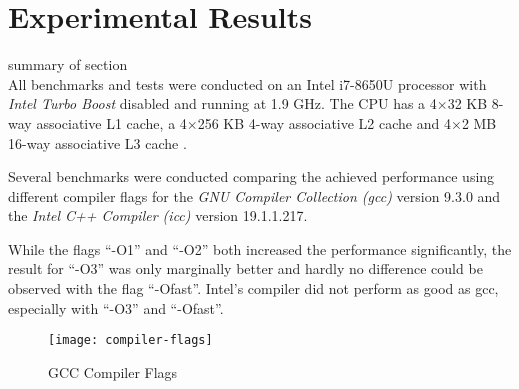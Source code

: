 \section{Experimental Results}\label{sec:exp}

summary of section\\

 All benchmarks and tests were conducted on an Intel
i7-8650U processor with \textit{Intel Turbo Boost} disabled and running at 1.9
GHz. The CPU has a 4$\times$32 KB 8-way associative L1 cache, a 4$\times$256 KB
4-way associative L2 cache and 4$\times$2 MB 16-way associative L3 cache
\cite{intel-opt-manual}.

 Several benchmarks were conducted comparing the achieved
performance using different compiler flags for the \textit{GNU Compiler
  Collection (gcc)} version 9.3.0 and the \textit{Intel C++ Compiler (icc)}
version 19.1.1.217.

While the flags ``-O1'' and ``-O2'' both increased the performance
significantly, the result for ``-O3'' was only marginally better and hardly no
difference could be observed with the flag ``-Ofast''. Intel's compiler did not
perform as good as gcc, especially with ``-O3'' and ``-Ofast''.


\begin{figure}[ht]
  \texttt{[image: compiler-flags]}
  \caption{GCC Compiler Flags}
\end{figure}








